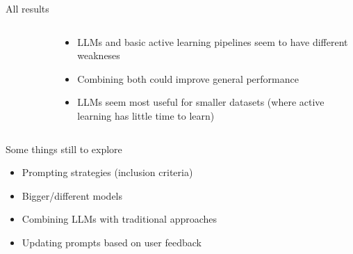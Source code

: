 \documentclass[9pt,aspectratio=169]{beamer}
\begin{document}
\begin{frame}{All results}
	\begin{columns}
	\begin{column}{0.618\linewidth}
		\begin{figure}
			

		\end{figure}
	\end{column}
	\begin{column}{0.382\linewidth}
		\begin{itemize}
			\item<1-> LLMs and basic active learning pipelines seem to have different weakneses
			\item<2-> Combining both could improve general performance
			\item<3-> LLMs seem most useful for smaller datasets (where active learning has little time to learn)
		\end{itemize}
	\end{column}
\end{columns}
\end{frame}


\begin{frame}{Some things still to explore}
	
\begin{itemize}
	\item<1-> Prompting strategies (inclusion criteria)
	\item<2-> Bigger/different models
	\item<3-> Combining LLMs with traditional approaches
	\item<4-> Updating prompts based on user feedback
\end{itemize}

\end{frame}
\end{document}
